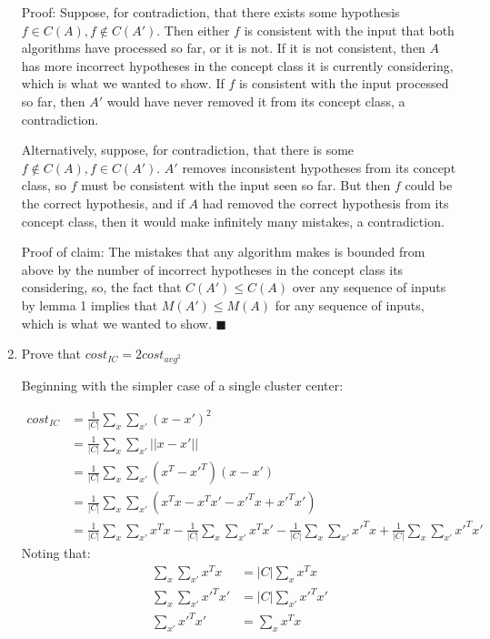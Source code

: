 \documentclass{article}
\begin{document}
\begin{enumerate}
Proof: Suppose, for contradiction, that there exists some hypothesis $f \in
C(A), f \not\in C(A')$. Then either $f$ is consistent with the input
that both algorithms have processed so far, or it is not. If it is not
consistent, then $A$ has more incorrect hypotheses in the concept
class it is currently considering, which is what we wanted to show. If
$f$ is consistent with the input processed so far, then $A'$ would
have never removed it from its concept class, a contradiction. 

Alternatively, suppose, for contradiction, that there is some $f
\not\in C(A), f \in C(A')$. $A'$ removes inconsistent hypotheses from its
concept class, so $f$ must be consistent with the input seen so
far. But then $f$ could be the correct hypothesis, and if $A$ had
removed the correct hypothesis from its concept class, then it would
make infinitely many mistakes, a contradiction. 

Proof of claim: 
The mistakes that any algorithm makes is bounded from
above by the number of incorrect hypotheses in the concept class its
considering, so, the fact that $C(A') \leq C(A)$ over any sequence of
inputs by lemma 1 implies that $M(A') \leq M(A)$ for any sequence of inputs, which is what we wanted to show. $\blacksquare$

\item Prove that $cost_{IC} = 2cost_{avg^2}$

Beginning with the simpler case of a single cluster center:

\begin{align*}
  cost_{IC} &= \frac 1 {|C|} \sum\limits_{x} \sum\limits_{x'} (x - x')^2\\
  &= \frac 1 {|C|} \sum\limits_{x} \sum\limits_{x'} ||x - x'||\\
  &= \frac 1 {|C|} \sum\limits_{x} \sum\limits_{x'} (x^T - x'^T)(x - x')\\
  &= \frac 1 {|C|} \sum\limits_{x} \sum\limits_{x'} (x^Tx - x^Tx' - x'^Tx + x'^Tx')\\
  &= \frac 1 {|C|} \sum\limits_{x} \sum\limits_{x'} x^Tx -  \frac 1 {|C|} \sum\limits_{x} \sum\limits_{x'} x^Tx' -  \frac 1 {|C|} \sum\limits_{x} \sum\limits_{x'}x'^Tx +  \frac 1 {|C|} \sum\limits_{x} \sum\limits_{x'} x'^Tx'
\end{align*}
Noting that:
\begin{align*}
  \sum\limits_{x} \sum\limits_{x'} x^Tx &= |C| \sum\limits_{x} x^Tx\\
  \sum\limits_{x} \sum\limits_{x'} x'^Tx' &= |C| \sum\limits_{x'} x'^Tx'\\
  \sum\limits_{x'} x'^Tx' &= \sum\limits_{x} x^Tx\\
\end{align*}


\end{enumerate}
\end{document}
